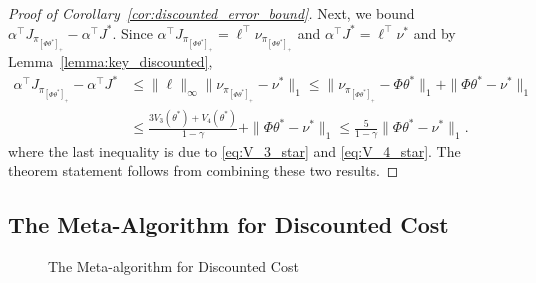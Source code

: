 \documentclass[11pt]{article}
\begin{document}
\begin{proof}[Proof of Corollary~\ref{cor:discounted_error_bound}]
Next, we bound $\alpha^\top J_{\pi_{ [\Phi \theta^*]_{+}}} - \alpha^\top J^*$. Since $\alpha^\top J_{\pi_{ [\Phi \theta^*]_{+}}}= \ell^{\top} \nu_{\pi_{ [\Phi  \theta^*]_{+}}} $ and $\alpha^\top J^*= \ell^{\top} \nu^* $ and by Lemma~\ref{lemma:key_discounted},
\begin{align*}
  \alpha^\top J_{\pi_{ [\Phi \theta^*]_{+}}} - \alpha^\top J^* & \leq \|\ell\|_{\infty} \|\nu_{\pi_{ [\Phi  \theta^*]_{+}}} - \nu^*\|_1 \leq  \|\nu_{\pi_{ [\Phi  \theta^*]_{+}}} - \Phi \theta^*\|_1 + \|\Phi \theta^* - \nu^*\|_1 \\
  & \leq \frac{3 V_3(\theta^*) + V_4(\theta^*)}{1-\gamma}  + \|\Phi \theta^* - \nu^*\|_1  \leq  \frac{5}{1-\gamma}  \|\Phi \theta^* - \nu^*\|_1.
  \label{eq:gap_opt_mu}
\end{align*}
where the last inequality is due to \eqref{eq:V_3_star} and \eqref{eq:V_4_star}. The theorem statement follows from combining these two results.
\end{proof}

\subsection{The Meta-Algorithm for Discounted Cost}
\label{sec:discounted_meta}

\begin{figure}
\begin{center}
\end{center}
\caption{The Meta-algorithm for Discounted Cost}
\label{alg:meta_discounted}
\end{figure}
\end{document}
